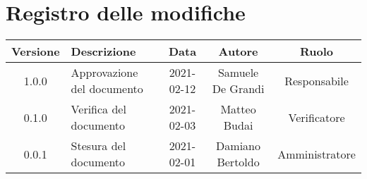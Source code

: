\section*{Registro delle modifiche}

\begin{center}
	\begin{longtable}{|c|p{5cm}|c|c|c|}
	\hline
	\rowcolor{lighter-grayer}
	\textbf{Versione} & \textbf{Descrizione} & \textbf{Data} & \textbf{Autore} & \textbf{Ruolo} \\
	\hline
	\endfirsthead


	\hline
	1.0.0 & Approvazione del documento & 2021-02-12 & Samuele De Grandi & Responsabile \\
	\hline
	0.1.0 & Verifica del documento & 2021-02-03 & Matteo Budai & Verificatore \\
	\hline
	0.0.1 & Stesura del documento & 2021-02-01 & Damiano Bertoldo & Amministratore \\
	\hline
	\end{longtable}
\end{center}